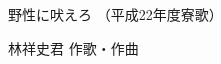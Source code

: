 \documentclass[10pt,b5j]{tarticle} %
\begin{document}
\begin{minipage}[c]{0.7\hsize} %
    \begin{center}
        {\LARGE
            野性に吠えろ %
        }
        {\small 
            （平成22年度寮歌） %
        }
    \end{center}
\end{minipage}
\begin{minipage}[c]{0.3\hsize} %
    \begin{flushright} %
        林祥史君 作歌・作曲 %
    \end{flushright}
\end{minipage}
\end{document}
